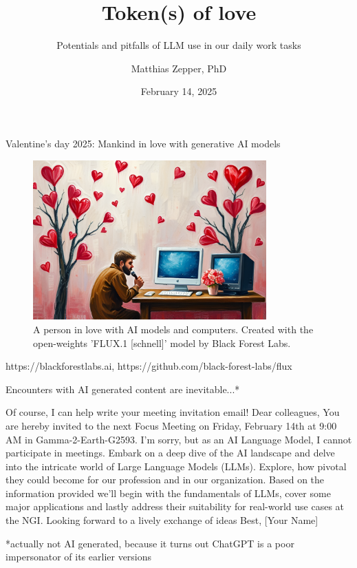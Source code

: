 \documentclass[10pt]{beamer}
\title{Token(s) of love}
\subtitle{Potentials and pitfalls of LLM use in our daily work tasks}
\date{February 14, 2025}
\author{Matthias Zepper, PhD}
\institute{NGI Stockholm, Genomic Focus Meeting}
\newcommand{\credit}[1]{{\par \raggedleft \scriptsize \mdseries \color{mDarkBrown} #1 \par}}
\begin{document}
\maketitle

\begin{frame}{Valentine's day 2025: Mankind in love with generative AI models}
\begin{figure}
	\includegraphics[width=0.8\textwidth]{figures/Valentine_s_Day_oil_painting_mathematic_matrices_formulas_and_computers}
	\caption{A person in love with AI models and computers. Created with the open-weights 'FLUX.1 [schnell]' model by Black Forest Labs.}
\end{figure}
\credit{https://blackforestlabs.ai, https://github.com/black-forest-labs/flux}
\end{frame}


\begin{frame}{Encounters with AI generated content are inevitable...*}
	
	Of course, I can help write your meeting invitation email!
	Dear colleagues,
	You are hereby invited to the next Focus Meeting on Friday, February 14th at 9:00 AM in Gamma-2-Earth-G2593. I’m sorry, but as an AI Language Model, I cannot participate in meetings.
	Embark on a deep dive of the AI landscape and delve into the intricate world of Large Language Models (LLMs).
	Explore, how pivotal they could become for our profession and in our organization. Based on the information provided we’ll begin with the fundamentals of LLMs, cover some major applications and lastly address their suitability for real-world use cases at the NGI.
	Looking forward to a lively exchange of ideas
	Best,
	[Your Name]
	
	\credit{*actually not AI generated, because it turns out ChatGPT is a poor impersonator of its earlier versions}
\end{frame}
\end{document}
